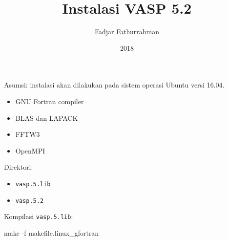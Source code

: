 \documentclass[a4paper,11pt]{extarticle}
\title{Instalasi VASP 5.2}
\author{Fadjar Fathurrahman}
\date{2018}
\begin{document}
\maketitle

Asumsi: instalasi akan dilakukan pada sistem operasi Ubuntu versi 16.04.

\begin{itemize}
\item GNU Fortran compiler
\item BLAS dan LAPACK
\item FFTW3
\item OpenMPI
\end{itemize}

Direktori:
\begin{itemize}
\item \texttt{vasp.5.lib}
\item \texttt{vasp.5.2}
\end{itemize}

Kompilasi \texttt{vasp.5.lib}:
\begin{textcode}
make -f makefile.linux_gfortran
\end{textcode}
\end{document}
